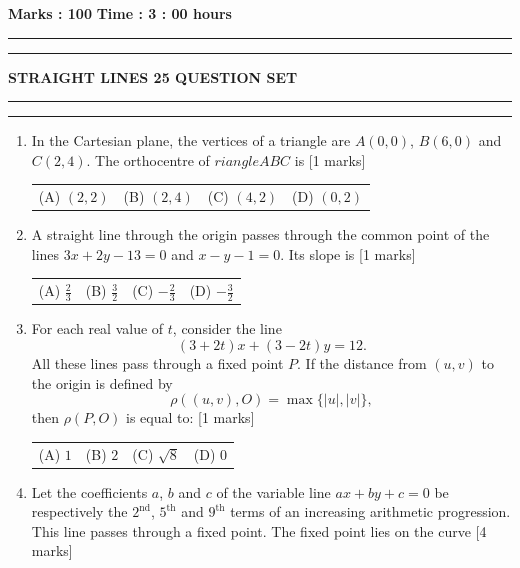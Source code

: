 \documentclass[11pt,a4paper]{article}
\begin{document}
\vspace{2mm}
\noindent \textbf{Marks : 100} \hfill \textbf{Time : 3 : 00 hours}
\noindent\rule{\linewidth}{1.1pt}\vspace{-1mm}\noindent\rule{\linewidth}{0.5pt}
{\centering \Large \textbf{STRAIGHT LINES 25 QUESTION SET}\par}
\noindent\rule{\linewidth}{1.1pt}\vspace{-1mm}\noindent\rule{\linewidth}{0.5pt}
\vspace{2mm}

\begin{enumerate}[resume]
\item In the Cartesian plane, the vertices of a triangle are $A(0,0)$, $B(6,0)$ and $C(2,4)$. The orthocentre of $	riangle ABC$ is \hfill [1 marks]
{\renewcommand{\arraystretch}{1.8}
\begin{tabularx}{\linewidth}{X X X X}
(A) \quad $(2,2)$ & (B) \quad $(2,4)$ & (C) \quad $(4,2)$ & (D) \quad $(0,2)$ \\[10pt]
\end{tabularx}}
\item A straight line through the origin passes through the common point of the lines $3x+2y-13=0$ and $x-y-1=0$. Its slope is \hfill [1 marks]
{\renewcommand{\arraystretch}{1.8}
\begin{tabularx}{\linewidth}{X X X X}
(A) \quad $\frac{2}{3}$ & (B) \quad $\frac{3}{2}$ & (C) \quad $-\frac{2}{3}$ & (D) \quad $-\frac{3}{2}$ \\[10pt]
\end{tabularx}}
\item For each real value of $t$, consider the line
$$ (3+2t)x+(3-2t)y=12. $$
All these lines pass through a fixed point $P$. If the distance from $(u,v)$ to the origin is defined by
$$\rho((u,v),O)=\max\{|u|,|v|\},$$
then $\rho(P,O)$ is equal to: \hfill [1 marks]
{\renewcommand{\arraystretch}{1.8}
\begin{tabularx}{\linewidth}{X X X X}
(A) \quad $1$ & (B) \quad $2$ & (C) \quad $\sqrt{8}$ & (D) \quad $0$ \\[10pt]
\end{tabularx}}
\item Let the coefficients $a$, $b$ and $c$ of the variable line $ax+by+c=0$ be respectively the $2^{\text{nd}}$, $5^{\text{th}}$ and $9^{\text{th}}$ terms of an increasing arithmetic progression. This line passes through a fixed point. The fixed point lies on the curve \hfill [4 marks]
{\renewcommand{\arraystretch}{1.8}
\begin{tabularx}{\linewidth}{X X}

\end{tabularx}}
\end{enumerate}
\end{document}
